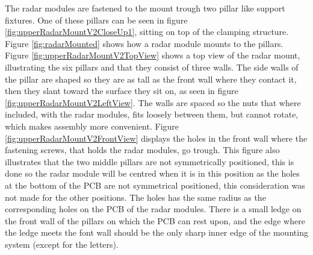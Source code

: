 The radar modules are fastened to the mount trough two pillar like support fixtures. One of these pillars can be seen in figure \ref{fig:upperRadarMountV2CloseUp1}, sitting on top of the clamping structure. Figure \ref{fig:radarMounted} shows how a radar module mounts to the pillars. Figure \ref{fig:upperRadarMountV2TopView} shows a top view of the radar mount, illustrating the six pillars and that they consist of three walls. The side walls of the pillar are shaped so they are as tall as the front wall where they contact it, then they slant toward the surface they sit on, as seen in figure \ref{fig:upperRadarMountV2LeftView}. The walls are spaced so the nuts that where included, with the radar modules, fits loosely between them, but cannot rotate, which makes assembly more convenient. Figure \ref{fig:upperRadarMountV2FrontView} displays the holes in the front wall where the fastening screws, that holds the radar modules, go trough. This figure also illustrates that the two middle pillars are not symmetrically positioned, this is done so the radar module will be centred when it is in this position as the holes at the bottom of the PCB are not symmetrical positioned, this consideration was not made for the other positions. The holes has the same radius as the corresponding holes on the PCB of the radar modules. There is a small ledge on the front wall of the pillars on which the PCB can rest upon, and the edge where the ledge meets the font wall should be the only sharp inner edge of the mounting system (except for the letters). 

